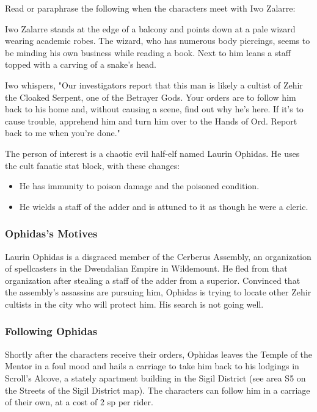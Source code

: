 \documentclass[10pt,a4paper,twoside,twocolumn,openany,nodeprecatedcode]{dndbook}
\begin{document}
Read or paraphrase the following when the characters meet with Iwo Zalarre:

\begin{DndReadAloud}{}
Iwo Zalarre stands at the edge of a balcony and points down at a pale wizard wearing academic robes. The wizard, who has numerous body piercings, seems to be minding his own business while reading a book. Next to him leans a staff topped with a carving of a snake's head.

Iwo whispers, "Our investigators report that this man is likely a cultist of Zehir the Cloaked Serpent, one of the Betrayer Gods. Your orders are to follow him back to his home and, without causing a scene, find out why he's here. If it's to cause trouble, apprehend him and turn him over to the Hands of Ord. Report back to me when you're done."

\end{DndReadAloud}

The person of interest is a chaotic evil half-elf named Laurin Ophidas. He uses the cult fanatic stat block, with these changes:


\begin{itemize}
\item He has immunity to poison damage and the poisoned condition.
\item He wields a staff of the adder and is attuned to it as though he were a cleric.
\end{itemize}

\subsubsection{Ophidas's Motives}
Laurin Ophidas is a disgraced member of the Cerberus Assembly, an organization of spellcasters in the Dwendalian Empire in Wildemount. He fled from that organization after stealing a staff of the adder from a superior. Convinced that the assembly's assassins are pursuing him, Ophidas is trying to locate other Zehir cultists in the city who will protect him. His search is not going well.

\subsubsection{Following Ophidas}
Shortly after the characters receive their orders, Ophidas leaves the Temple of the Mentor in a foul mood and hails a carriage to take him back to his lodgings in Scroll's Alcove, a stately apartment building in the Sigil District (see area S5 on the Streets of the Sigil District map). The characters can follow him in a carriage of their own, at a cost of 2 sp per rider.
\end{document}
